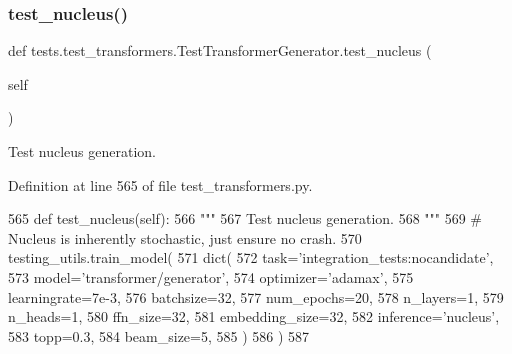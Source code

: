 \mbox{\label{classtests_1_1test__transformers_1_1TestTransformerGenerator_ab1e05d5384de2fcd880f515108de9b4a}} 
\subsubsection{\texorpdfstring{test\+\_\+nucleus()}{test\_nucleus()}}
{\footnotesize\ttfamily def tests.\+test\+\_\+transformers.\+Test\+Transformer\+Generator.\+test\+\_\+nucleus (\begin{DoxyParamCaption}\item[{}]{self }\end{DoxyParamCaption})}

\begin{DoxyVerb}Test nucleus generation.
\end{DoxyVerb}
 

Definition at line 565 of file test\+\_\+transformers.\+py.


\begin{DoxyCode}
565     \textcolor{keyword}{def }test\_nucleus(self):
566         \textcolor{stringliteral}{"""}
567 \textcolor{stringliteral}{        Test nucleus generation.}
568 \textcolor{stringliteral}{        """}
569         \textcolor{comment}{# Nucleus is inherently stochastic, just ensure no crash.}
570         testing\_utils.train\_model(
571             dict(
572                 task=\textcolor{stringliteral}{'integration\_tests:nocandidate'},
573                 model=\textcolor{stringliteral}{'transformer/generator'},
574                 optimizer=\textcolor{stringliteral}{'adamax'},
575                 learningrate=7e-3,
576                 batchsize=32,
577                 num\_epochs=20,
578                 n\_layers=1,
579                 n\_heads=1,
580                 ffn\_size=32,
581                 embedding\_size=32,
582                 inference=\textcolor{stringliteral}{'nucleus'},
583                 topp=0.3,
584                 beam\_size=5,
585             )
586         )
587 
\end{DoxyCode}
\mbox{\label{classtests_1_1test__transformers_1_1TestTransformerGenerator_a571dff6d213773d3590419d84f0b088f}} 
